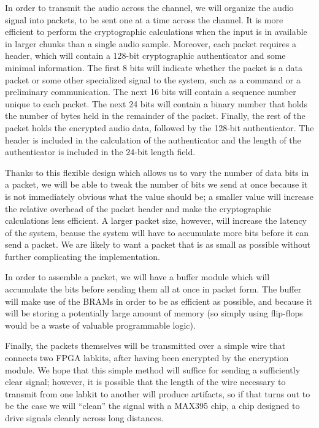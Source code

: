 \documentclass[a4paper]{article}
\begin{document}
In order to transmit the audio across the channel, we will organize the audio
signal into packets, to be sent one at a time across the channel. It is more
efficient to perform the cryptographic calculations when the input is in
available in larger chunks than a single audio sample. Moreover, each packet
requires a header, which will contain a 128-bit cryptographic authenticator and
some minimal information. The first 8 bits will indicate whether the packet
is a data packet or some other specialized signal to the system, such as a
command or a preliminary communication. The next 16 bits will contain a sequence
number unique to each packet. The next 24 bits will contain a binary number that
holds the number of bytes held in the remainder of the packet.  Finally, the
rest of the packet holds the encrypted audio data, followed by the 128-bit
authenticator. The header is included in the calculation of the authenticator
and the length of the authenticator is included in the 24-bit length field.

Thanks to this flexible design which allows us to vary the number of data bits
in a packet, we will be able to tweak the number of bits we send at once because
it is not immediately obvious what the value should be; a smaller value will
increase the relative overhead of the packet header and make the cryptographic
calculations less efficient. A larger packet size, however, will increase the
latency of the system, beause the system will have to accumulate more bits
before it can send a packet. We are likely to want a packet that is as small as
possible without further complicating the implementation.

In order to assemble a packet, we will have a buffer module which will
accumulate the bits before sending them all at once in packet form. The buffer
will make use of the BRAMs in order to be as efficient as possible, and because
it will be storing a potentially large amount of memory (so simply using
flip-flops would be a waste of valuable programmable logic).

Finally, the packets themselves will be transmitted over a simple wire that
connects two FPGA labkits, after having been encrypted by the encryption module.
We hope that this simple method will suffice for sending a sufficiently clear
signal; however, it is possible that the length of the wire necessary to
transmit from one labkit to another will produce artifacts, so if that turns out
to be the case we will ``clean'' the signal with a MAX395 chip, a chip designed
to drive signals cleanly across long distances.
\end{document}
